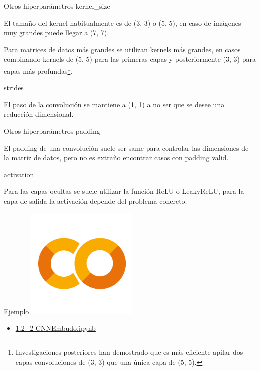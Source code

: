 \begin{frame}{Otros hiperparámetros}
\alert{\Large kernel\_size}

El tamaño del kernel \alert{habitualmente} es de \alert{(3, 3)} o \alert{(5, 5)}, en caso de imágenes muy grandes puede llegar a \alert{(7, 7)}.

Para matrices de datos \alert{más grandes} se utilizan \alert{kernels más grandes}, en casos combinando kernels de \alert{(5, 5)} para las \alert{primeras capas} y posteriormente \alert{(3, 3)} para capas más \alert{profundas}\footnote{Investigaciones posteriores \cite{simonyan2014very} han demostrado que es más eficiente apilar dos capas convoluciones de (3, 3) que una única capa de (5, 5).}.

\vfill
\alert{\Large strides}

El paso de la convolución se mantiene a \alert{(1, 1)} a no ser que se desee una \alert{reducción dimensional}.
\end{frame}

\begin{frame}{Otros hiperparámetros}
\alert{\Large padding}

El padding de una convolución suele ser \alert{same} para controlar las dimensiones de la matriz de datos, pero no es extraño encontrar casos con padding \alert{valid}.

\vfill
\alert{\Large activation}

Para las \alert{capas ocultas} se suele utilizar la función \alert{ReLU} o \alert{LeakyReLU}, para la capa de \alert{salida} la activación depende del \alert{problema concreto}.
\end{frame}

\begin{frame}{Ejemplo}
    \centering
    \includegraphics[width=0.4\textwidth]{Slides/figures/GoogleColab.png}
\begin{itemize}
    \centering
    \item {\Large \href{https://colab.research.google.com/drive/17QwnRs7P0bv6kYsbQPYIrIDjk-uL_9rd?usp=sharing}{1.2\_2-CNNEmbudo.ipynb}}
\end{itemize}
\end{frame}

